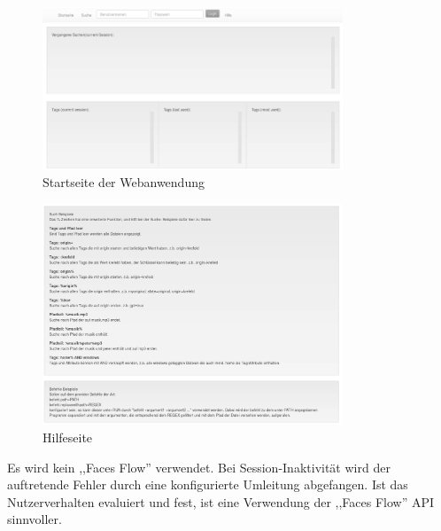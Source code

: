 \documentclass[oneside, ngerman, toc=bibliography,bibliography=totoc,listof=entryprefix, open=right,numbers=noenddot,fontsize=12pt]{scrbook}
\begin{document}
\begin{figure}[htbp] 
    \centering
    \includegraphics[width=0.8\textwidth]{Masterarbeit_Bilder/www_startseite.png}
    \caption{Startseite der Webanwendung}
    \label{fig:www-start}
\end{figure}  



\begin{figure}[htbp] 
    \centering
    \includegraphics[width=0.8\textwidth]{Masterarbeit_Bilder/www_help.png}
    \caption{Hilfeseite}
    \label{fig:www-help}
\end{figure}  




Es wird kein ,,Faces Flow'' verwendet. Bei Session-Inaktivität wird der auftretende Fehler durch eine konfigurierte Umleitung abgefangen. Ist das Nutzerverhalten evaluiert und fest, ist eine Verwendung der ,,Faces Flow'' API sinnvoller.
\end{document}
